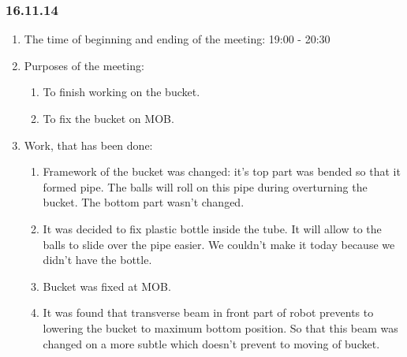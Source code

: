 
\subsubsection{16.11.14}

\begin{enumerate} 
	\item The time of beginning and ending of the meeting:
	19:00 - 20:30
	\item Purposes of the meeting:
	\begin{enumerate}
		\item To finish working on the bucket.
		
		\item To fix the bucket on MOB.
		
	\end{enumerate}
	
	\item Work, that has been done:
	\begin{enumerate}
		\item Framework of the bucket was changed: it's top part was bended so that it formed pipe. The balls will roll on this pipe during overturning the bucket. The bottom part wasn't changed.
		
		\item It was decided to fix plastic bottle  inside the tube. It will allow to the balls to slide over the pipe easier. We couldn't make it today because we didn't have the bottle.
		
		\item Bucket was fixed at MOB.
		
		\item It was found that transverse beam in front part of robot prevents to lowering the bucket to maximum bottom position. So that this beam was changed on a more subtle which doesn't prevent to moving of bucket.
		

\end{enumerate}
\end{enumerate}
